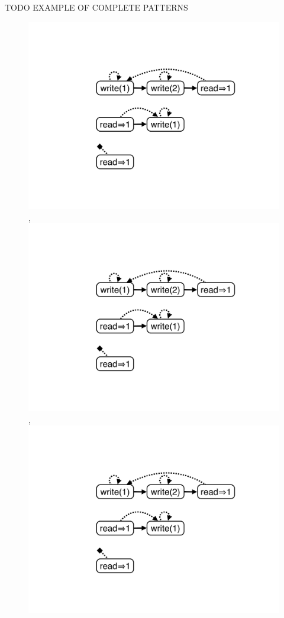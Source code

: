 \begin{example}

  TODO EXAMPLE OF COMPLETE PATTERNS

  \begin{figure}[t]
    \centering
    \includegraphics[scale=0.2]{figures/register-pattern-1},
    \includegraphics[scale=0.2]{figures/register-pattern-2},
    \includegraphics[scale=0.2]{figures/register-pattern-3}

\end{figure}
\end{example}
